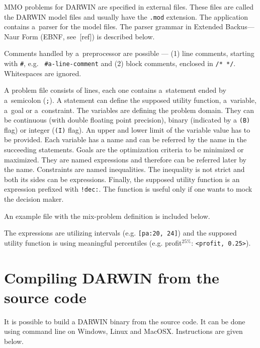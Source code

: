 MMO problems for DARWIN are specified in external files. These files are called the
DARWIN model files and usually have the \texttt{.mod} extension. The
application contains a~parser for the model files. The parser grammar in
Extended Backus---Naur Form (EBNF, see~[ref]) is described below.



Comments handled by a~preprocessor are possible --- (1) line comments,
starting with \texttt{\#}, e.g. \texttt{ \#a-line-comment} and (2) block
comments, enclosed in \texttt{/* */}. Whitespaces are ignored.

A problem file consists of lines, each one contains a~statement ended by
a~semicolon (\texttt{;}). A statement can define the supposed utility
function, a~variable, a~goal or a~constraint. The variables are defining the
problem domain. They can be continuous (with double floating point precision),
binary (indicated by a \texttt{(B)} flag) or integer (\texttt{(I)} flag). An
upper and lower limit of the variable value has to be provided. Each variable
has a name and can be referred by the name in the succeeding statements. Goals
are the optimization criteria to be minimized or maximized. They are named
expressions and therefore can be referred later by the name. Constraints are
named inequalities. The inequality is not strict and both its sides can be
expressions. Finally, the supposed utility function is an expression prefixed
with \texttt{!dec:}. The function is useful only if one wants to mock the
decision maker.

An example file with the mix-problem definition is included below.



The expressions are utilizing intervals (e.g. \texttt{[pa:20, 24]}) and the
supposed utility function is using meaningful percentiles
(e.g. profit$^{25\%}$: \texttt{<profit, 0.25>}).



\section*{Compiling DARWIN from the source code}

It is possible to build a DARWIN binary from the source code. It can be done
using command line on Windows, Linux and MacOSX.  Instructions are given
below.

